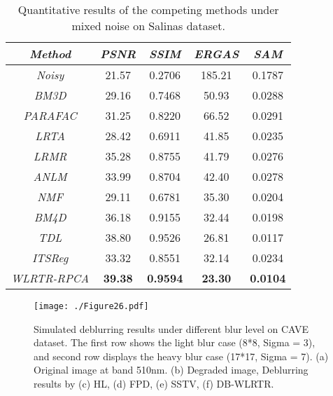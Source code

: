 \documentclass[twocolumn]{svjour3}          %
\begin{document}
\begin{table}[tbp]
\scriptsize
\centering
\renewcommand{\arraystretch}{1.2}
\caption{Quantitative results of the competing methods under mixed noise on Salinas dataset.}
\begin{tabular}{c c c c c}
\toprule[2pt]
\emph{Method}  & \emph{PSNR }&  \emph{SSIM} &  \emph{ERGAS} &  \emph{SAM} \\
\hline
\emph{Noisy}   &  21.57      &   0.2706     &   185.21    &  0.1787     \\
\hline
\emph{BM3D}    &  29.16      &   0.7468     &   50.93     &  0.0288     \\
\hline
\emph{PARAFAC} &  31.25      &   0.8220     &   66.52     &  0.0291     \\
\hline
\emph{LRTA}    &  28.42      &   0.6911     &   41.85     &  0.0235     \\
\hline
\emph{LRMR}    &  35.28      &   0.8755     &   41.79     &  0.0276     \\
\hline
\emph{ANLM}    &  33.99      &   0.8704     &   42.40     &  0.0278     \\
\hline
\emph{NMF}     &  29.11      &   0.6781     &   35.30     &  0.0204     \\
\hline
\emph{BM4D}    &  36.18      &   0.9155     &   32.44     &  0.0198     \\
\hline
\emph{TDL}     &  38.80      &   0.9526     &   26.81     &  0.0117     \\
\hline
\emph{ITSReg}  &  33.32      &   0.8551     &   32.14     &  0.0234     \\
\hline
\emph{WLRTR-RPCA}     &    \textbf{39.38 }    &  \textbf{ 0.9594 }   &   \textbf{23.30}    &  \textbf{0.0104 }    \\
\bottomrule[2pt]
\end{tabular}
\label{Salinas Quantitative}
\end{table}

\begin{figure*}
\begin{center}
    \texttt{[image: ./Figure26.pdf]}
\end{center}
   \caption{Simulated deblurring results under different blur level on CAVE dataset. The first row shows the light blur case (8*8, Sigma = 3), and second row displays the heavy blur case (17*17, Sigma = 7). (a) Original image at band 510nm. (b) Degraded image, Deblurring results by (c) HL, (d) FPD, (e) SSTV, (f) DB-WLRTR.}
\label{Deblurring}
\end{figure*}
\end{document}
